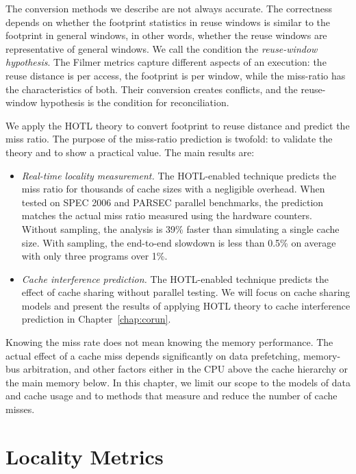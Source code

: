 The conversion methods we describe are not always accurate.  The
correctness depends on whether the footprint statistics in reuse
windows is similar to the footprint in general windows, in other
words, whether the reuse windows are representative of general
windows.  We call the condition the \emph{reuse-window hypothesis}.
The Filmer metrics capture different aspects of an execution: the
reuse distance is per access, the footprint is per window, while the
miss-ratio has the characteristics of both. Their conversion creates
conflicts, and the reuse-window hypothesis is the condition
for reconciliation.

We apply the HOTL theory to convert footprint to reuse distance and predict
the miss ratio. The purpose of the miss-ratio prediction is twofold:
to validate the theory and to show a practical value. The main results
are: 

\begin{itemize}
\item \emph{Real-time locality measurement.}  The HOTL-enabled
  technique predicts the miss ratio for thousands of cache sizes with
  a negligible overhead.  When tested on SPEC 2006 and
  PARSEC parallel benchmarks, the prediction matches the actual miss
  ratio measured using the hardware counters.  Without sampling, the
  analysis is 39\% faster than simulating a single cache size.  With
  sampling, the end-to-end slowdown is less than 0.5\% on average with
  only three programs over 1\%.

\item \emph{Cache interference prediction.} The HOTL-enabled technique
  predicts the effect of cache sharing without parallel testing.  We
  will focus on cache sharing models and present the results of
  applying HOTL theory to cache interference prediction in Chapter~\ref{chap:corun}.
\end{itemize}

Knowing the miss rate does not mean knowing the memory performance.
The actual effect of a cache miss depends significantly on data
prefetching, memory-bus arbitration, and other factors either in the
CPU above the cache hierarchy or the main memory below.  In this
chapter, we limit our scope to the models of data and cache usage and to
methods that measure and reduce the number of cache misses.

\section{Locality Metrics}
\label{sec:metrics}

